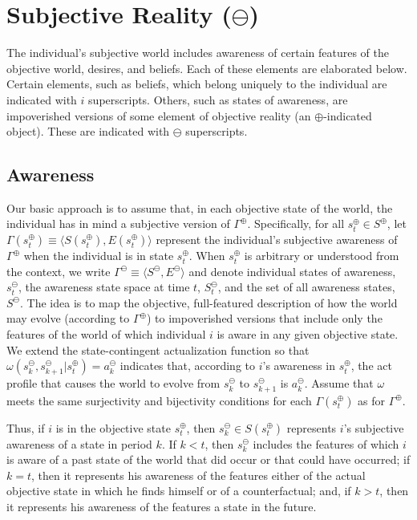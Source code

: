 \documentclass[
11pt,
titlepage,
reqno,
]{article}%
\theoremstyle{definition}
\begin{document}
	
	
	
	
	\section{Subjective Reality ($\ominus$)}
	The individual's subjective world includes awareness of certain features of the objective world, desires, and beliefs. 
	Each of these elements are elaborated below. 
	Certain elements, such as beliefs, which belong uniquely to the individual are indicated with $i$ superscripts.
	Others, such as states of awareness, are impoverished versions of some element of objective reality (an $\oplus$-indicated object). 
	These are indicated with $\ominus$ superscripts.
	
	\subsection{Awareness}
	Our basic approach is to assume that, in each objective state of the world, the individual has in mind a subjective version of $\Gamma^\oplus$. 
	Specifically, for all $s^\oplus_t\in S^\oplus$, let $\Gamma(s^\oplus_t)\equiv\langle S(s^\oplus_t),E(s^\oplus_t)\rangle$ represent the individual's subjective awareness of $\Gamma^\oplus$ when the individual is in state $s^\oplus_t$.
	When $s^\oplus_t$ is arbitrary or understood from the context, we write $\Gamma^\ominus\equiv\langle S^\ominus,E^\ominus\rangle$ and denote individual states of awareness, $s^\ominus_t$, the awareness state space at time $t$,  $S^\ominus_t$, and the set of all awareness states, $S^\ominus$.
	The idea is to map the objective, full-featured description of how the world may evolve (according to $\Gamma^\oplus$) to impoverished versions that include only the features of the world of which individual $i$ is aware in any given objective state.
	We extend the state-contingent actualization function so that $\omega (s^\ominus_k,s^\ominus_{k+1}|s^\oplus_t)=a^\ominus_k$ indicates that, according to $i$'s awareness in $s^\oplus_t$, the act profile that causes the world to evolve from $s^\ominus_k$ to $s^\ominus_{k+1}$ is $a^\ominus_k$.
	Assume that $\omega$ meets the same surjectivity and bijectivity conditions for each $\Gamma(s^\oplus_t)$ as for $\Gamma^\oplus$.
	
	
	Thus, if $i$ is in the objective state $s^\oplus_t$, then  $s^\ominus_k\in S(s^\oplus_t)$ represents $i$'s subjective awareness of a state in period $k$.
	If $k<t$, then  $s^\ominus_k$ includes the features of which $i$ is aware of a past state of the world that did occur or that could have occurred; if $k=t$, then  it represents his awareness of the features either of the actual objective state in which he finds himself or of a counterfactual; and, if $k>t$, then  it represents his awareness of the features a state in the future.
	
\end{document}
